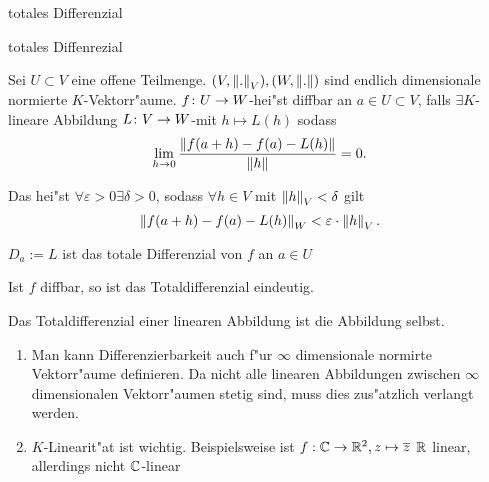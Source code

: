 \documentclass[class=article, crop=false]{standalone}
\begin{document}
\begin{zettel}{totales Differenzial}
\begin{flashcard}
	\begin{question}
		totales Diffenrezial
	\end{question}
	\begin{definition}
		Sei $U \subset  V$ eine offene Teilmenge. $(V,\left\|.\right\|_V), (W,\left\|.\right\|)$ sind endlich dimensionale normierte $K$-Vektorr"aume. $f \colon U\to W$-hei"st diffbar an $a \in  U \subset  V$, falls $\exists  K$-lineare Abbildung $L \colon V\to W$-mit $h \mapsto L (h)$ sodass
		\[
			\lim_{h \to 0} \frac{ \left\|f (a+h)- f (a)- L (h)\right\|}{ \left\|h\right\|} =0
		.\]

		Das hei"st $\forall\varepsilon>0 \exists\delta>0$, sodass $\forall h \in V$ mit $\left\|h\right\|_V < \delta$ gilt
		\[
			\left\| f (a +h) - f (a)- L (h)\right\|_W < \varepsilon \cdot  \left\|h\right\|_V
		.\]

		$D_a := L $ ist das totale Differenzial von $f$  an $a \in  U$
	\end{definition}
\end{flashcard}

\begin{remark}
	Ist $f$ diffbar, so ist das Totaldifferenzial eindeutig.
\end{remark}

\begin{remark}
	Das Totaldifferenzial einer linearen Abbildung ist die Abbildung selbst.
\end{remark}

\begin{remark}
	\begin{enumerate}
		\item Man kann Differenzierbarkeit auch f"ur $\infty$ dimensionale normirte Vektorr"aume definieren. Da nicht alle linearen Abbildungen zwischen $\infty$ dimensionalen Vektorr"aumen stetig sind, muss dies zus"atzlich verlangt werden.
		\item $K$-Linearit"at ist wichtig. Beispielsweise ist $f: \mathbb{C} \to \mathbb{R}^2, z \mapsto \overline{z}$ $\mathbb{R} $ linear, allerdings nicht $\mathbb{C} $-linear
	\end{enumerate}
\end{remark}

\end{zettel}
\end{document}
